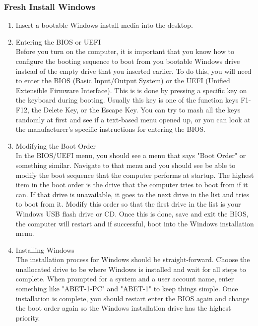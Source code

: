 \documentclass{article}
\begin{document}
\subsubsection{Fresh Install Windows}

\begin{enumerate}
  \item{Insert a bootable Windows install media into the desktop.}\\

  \item{Entering the BIOS or UEFI}\\
    Before you turn on the computer, it is important that you know how to
    configure the booting sequence to boot from you bootable Windows drive instead of
    the empty drive that you inserted earlier. To do this, you will need to
    enter the BIOS (Basic Input/Output System) or the UEFI (Unified Extensible
    Firmware Interface). This is is done by pressing a specific key on the
    keyboard during booting. Usually this key is one of the function keys
    F1-F12, the Delete Key, or the Escape Key. You can try to mash all the keys
    randomly at first and see if a text-based menu opened up, or you can look at
    the manufacturer's specific instructions for entering the BIOS.

  \item{Modifying the Boot Order}\\
    In the BIOS/UEFI menu, you should see a menu that says "Boot Order" or
    something similar. Navigate to that menu and you should see be able to
    modify the boot sequence that the computer performs at startup. The highest
    item in the boot order is the drive that the computer tries to boot from if
    it can. If that drive is unavailable, it goes to the next drive in the list
    and tries to boot from it. Modify this order so that the first drive in the
    list is your Windows USB flash drive or CD. Once this is done, save and exit
    the BIOS, the computer will restart and if successful, boot into the Windows
    installation menu.

  \item{Installing Windows}\\
    The installation process for Windows should be straight-forward. Choose the
    unallocated drive to be where Windows is installed and wait for all steps to
    complete. When prompted for a system and a user account name, enter
    something like "ABET-1-PC" and "ABET-1" to keep things simple. Once
    installation is complete, you should restart enter the BIOS again and change
    the boot order again so the Windows installation drive has the highest
    priority.

\end{enumerate}
\end{document}
